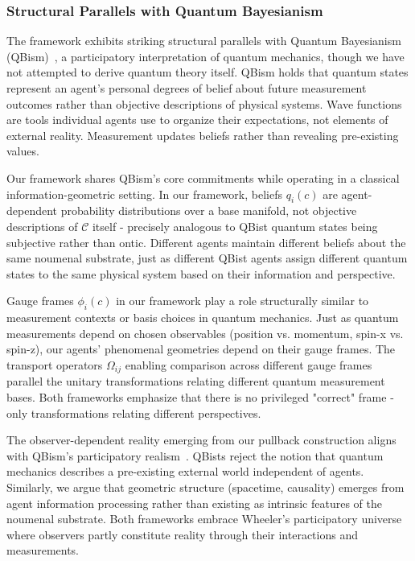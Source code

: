 \documentclass[11pt]{article}
\begin{document}
\subsubsection{Structural Parallels with Quantum Bayesianism}

The framework exhibits striking structural parallels with Quantum Bayesianism (QBism)~\cite{Fuchs2013,Fuchs2017,Caves2002}, a participatory interpretation of quantum mechanics, though we have not attempted to derive quantum theory itself. QBism holds that quantum states represent an agent's personal degrees of belief about future measurement outcomes rather than objective descriptions of physical systems. Wave functions are tools individual agents use to organize their expectations, not elements of external reality. Measurement updates beliefs rather than revealing pre-existing values.

Our framework shares QBism's core commitments while operating in a classical information-geometric setting. In our framework, beliefs $q_i(c)$ are agent-dependent probability distributions over a base manifold, not objective descriptions of $\mathcal{C}$ itself - precisely analogous to QBist quantum states being subjective rather than ontic. Different agents maintain different beliefs about the same noumenal substrate, just as different QBist agents assign different quantum states to the same physical system based on their information and perspective.

Gauge frames $\phi_i(c)$ in our framework play a role structurally similar to measurement contexts or basis choices in quantum mechanics. Just as quantum measurements depend on chosen observables (position vs. momentum, spin-x vs. spin-z), our agents' phenomenal geometries depend on their gauge frames. The transport operators $\Omega_{ij}$ enabling comparison across different gauge frames parallel the unitary transformations relating different quantum measurement bases. Both frameworks emphasize that there is no privileged "correct" frame - only transformations relating different perspectives.

The observer-dependent reality emerging from our pullback construction aligns with QBism's participatory realism~\cite{Fuchs2017participatory}. QBists reject the notion that quantum mechanics describes a pre-existing external world independent of agents. Similarly, we argue that geometric structure (spacetime, causality) emerges from agent information processing rather than existing as intrinsic features of the noumenal substrate. Both frameworks embrace Wheeler's participatory universe~\cite{Wheeler1990} where observers partly constitute reality through their interactions and measurements.
\end{document}
